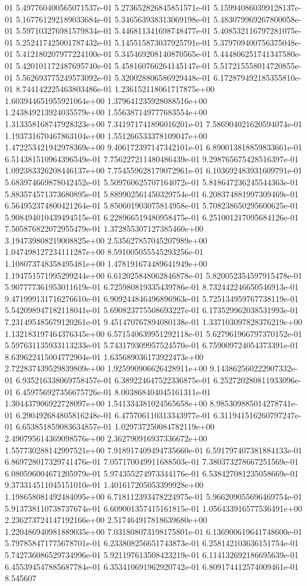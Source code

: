 01	5.497760400565071537e-01	5.273652826845851571e-01	5.159940860399128137e-01	5.167761292189033684e-01	5.346563938313069198e-01	5.483079969267800058e-01	5.597103276981579834e-01	5.446811341698748477e-01	5.408532116797281075e-01	5.252417425001787432e-01	5.145515873037925791e-01	5.379709400756375048e-01	5.412180207977224100e-01	5.345469208140870565e-01	5.444806251741347580e-01	5.420101172487695740e-01	5.458160766264145147e-01	5.517215558014720855e-01	5.562693775249573092e-01	5.320028806586929448e-01	6.172879492185355810e-01	8.744142225463803486e-01	1.236152118061717875e+00	1.603944651955921064e+00	1.379641235928088516e+00	1.243849213924035579e+00	1.556387149777683554e+00	1.313358168747928323e+00	7.341971741896016201e-01	7.586904021620594074e-01	1.193731670467863104e+00	1.551266533378109047e+00	1.472253421942978369e+00	9.406172397147342101e-01	6.890013818859833661e-01	6.514381510964396549e-01	7.756227211480486439e-01	9.298765675428516397e-01	1.092383326208446137e+00	7.754559628179072961e-01	6.103692483931609791e-01	5.683974669878042452e-01	5.509760625707164072e-01	5.818647236245544363e-01	5.883574571373680895e-01	5.889902561450329754e-01	6.208374881997309469e-01	6.564952374800421264e-01	5.850601903075814958e-01	5.708238650295600625e-01	5.908494010439494515e-01	6.228966519480958475e-01	6.251001217095684126e-01	7.505876822072955479e-01	1.372855307127385460e+00	3.194739808219008825e+00	2.535627857045207989e+00	1.047498127234111287e+00	8.591005055545293256e-01	1.108073748358495481e+00	1.478191674489641949e+00	1.194751571995299244e+00	6.612025848062846878e-01	5.820052354597915478e-01	5.907777361953011619e-01	6.725980819335439786e-01	8.732442246650546913e-01	9.471999131716276610e-01	6.909244846496896963e-01	5.725134959767738119e-01	5.542098947182118041e-01	5.690823775508693227e-01	6.173529962038531993e-01	7.231495485679120261e-01	9.451470767894080138e-01	1.337103097828376219e+00	1.132183197464376345e+00	6.571540639951292118e-01	5.627961966797370152e-01	5.597631135933113233e-01	5.743179309957524570e-01	6.759009724054373391e-01	8.639622415004772904e-01	1.635689036173922473e+00	2.722837439529839809e+00	1.925990906626428911e+00	9.143862560222907332e-01	6.935216338069758457e-01	6.389224647522336875e-01	6.252720280811933096e-01	6.459756927356675726e-01	8.003868404045161311e-01	1.304437906922728097e+00	1.541334381024565658e+00	8.985309885014278741e-01	6.290492684805816248e-01	6.475706110313343977e-01	6.311941516260797247e-01	6.653851859083634857e-01	1.029737250084782119e+00	2.490795614369098576e+00	2.362790916937336672e+00	1.557730288142997521e+00	7.918917409494735660e-01	6.591797407381884133e-01	6.869728017329741476e-01	7.057170049911688503e-01	7.380373278667251569e-01	6.080596004671205979e-01	5.974355274973344176e-01	6.538427081235058669e-01	9.373314511045151010e-01	1.401617205053399928e+00	1.198658081492484095e+00	6.718112393478224975e-01	5.966209055696469754e-01	5.913738110738737674e-01	6.609001357415161815e-01	1.056433916577536491e+00	2.236273724147192166e+00	2.517464917818639680e+00	1.220486940981889035e+00	7.031808073198175801e-01	6.136900619641748600e-01	5.797858471775678701e-01	6.233808256651743873e-01	6.258142103636151754e-01	5.742736086529734996e-01	5.921197613508423219e-01	6.114132692186695639e-01	6.455394547885687784e-01	6.353410691962920742e-01	6.809174412574009461e-01	8.545607